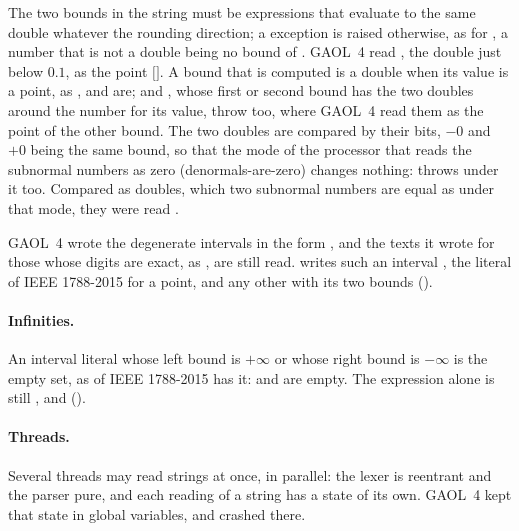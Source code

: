 \documentclass[12pt,a4paper,twoside,openright]{book}
\begin{document}
The two bounds in the string  must be expressions that
evaluate to the same double whatever the rounding direction; a
 exception is raised otherwise, as for
, a number that is not a double being no bound of
.\newinvfive{} GAOL~4 read
, the double just below $0.1$, as the
point $[$$]$. A bound that is computed is a
double when its value is a point, as ,  and
\code{[0.5]} are;  and
, whose first or second bound has the two
doubles around the number for its value, throw 
too, where GAOL~4 read them as the point of the other bound.\newinvfive{}
The two doubles are compared by their bits, $-0$ and $+0$ being the same
bound, so that the mode of the processor that reads the subnormal numbers
as zero (denormals-are-zero) changes nothing: 
throws under it too.\newinvfive{} Compared as doubles, which two subnormal
numbers are equal as under that mode, they were read
.

\begin{Rem}
GAOL~4 wrote the degenerate intervals in the form , and the
texts it wrote for those whose digits are exact, as , are still
read.  writes such an interval \code{[a]}, the literal of
IEEE 1788-2015 for a point, and any other with its two bounds
().
\end{Rem}

\paragraph{Infinities.} An interval literal whose left bound is $+\infty$ or
whose right bound is $-\infty$ is the empty set, as  of
IEEE 1788-2015 has it:  and  are
empty.\newinvfive{} The expression  alone is still
, and  
().

\paragraph{Threads.} Several threads may read strings at once, in parallel:
the lexer is reentrant and the parser pure, and each reading of a string has
a state of its own.\newinvfive{} GAOL~4 kept that state in global variables,
and crashed there.
\end{document}
